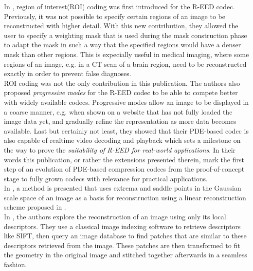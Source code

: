 In \cite{peter15}, region of interest(ROI) coding was first introduced for the R-EED codec. Previously,
it was not possible to specify certain regions of an image to be reconstructed with higher detail.
With this new contribution, they allowed the user to specify a weighting mask that is used during
the mask construction phase to adapt the mask in such a way that the specified regions would have a
denser mask than other regions. This is expecially useful in medical imaging, where some regions of
an image, e.g. in a CT scan of a brain region, need to be reconstructed exactly in order to prevent
false diagnoses. \\
ROI coding was not the only contribution in this publication. The authors also proposed
\textit{progressive modes} for the R-EED codec to be able to compete better with widely available codecs.
Progressive modes allow an image to be displayed in a coarse manner, e.g. when shown on a website
that has not fully loaded the image data yet, and gradually refine the representation as more data
becomes available. Last but certainly not least, they showed that their PDE-based codec is also
capable of realtime video decoding and playback which sets a milestone on the way to prove the
\textit{suitability of R-EED for real-world applications}\cite{peter15}. In their words this
publication, or rather the extensions presented therein, mark the first step of an evolution of
PDE-based compression codecs from the proof-of-concept stage to fully grown codecs with relevance
for practical applications.\cite{peter15}\\

In \cite{kanters05}, a method is presented that uses extrema and saddle points in the Gaussian
scale space of an image as a basis for reconstruction using a linear reconstruction scheme proposed
in \cite{janssen05}.\\
In \cite{weinzaepfel11}, the authors explore the reconstruction of an image using only its local
descriptors. They use a classical image indexing software to retrieve descriptors like
SIFT\cite{sift}, then query an image database to find patches that are similar to these descriptors
retrieved from the image. These patches are then transformed to fit the geometry in the original
image and stitched together afterwards in a seamless fashion.\\



